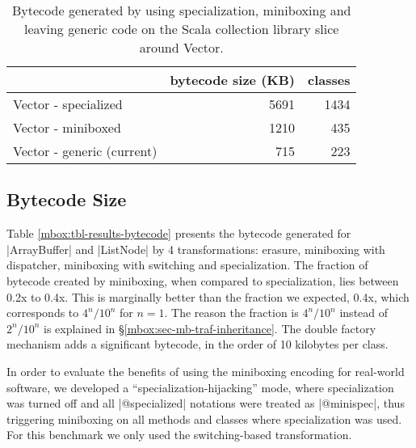 \begin{table}[b!]
\centering
\small
\begin{tabular}{l|r|r}
                               &  bytecode size (KB) & classes \\\hline
Vector - specialized           &                5691 &    1434 \\
\rowcolor{Gray}
Vector - miniboxed             &                1210 &     435 \\
Vector - generic (current)     &                 715 &     223 \\
\end{tabular}
\caption{Bytecode generated by using specialization, miniboxing and leaving generic code on the Scala collection library slice around Vector.}
\label{mbox:tbl-results-bytecode-vector}
\end{table}

\subsection{Bytecode Size}
\label{mbox:subsec-eval-size}

Table \ref{mbox:tbl-results-bytecode} presents the bytecode generated for |ArrayBuffer| and |ListNode| by 4 transformations: erasure, miniboxing with dispatcher, miniboxing with switching and specialization. The fraction of bytecode created by miniboxing, when compared to specialization, lies between 0.2x to 0.4x. This is marginally better than the fraction we expected, 0.4x, which corresponds to $4^n / 10^n$ for $n=1$. The reason the fraction is $4^n / 10^n$ instead of $2^n / 10^n$ is explained in \S \ref{mbox:sec-mb-traf-inheritance}. The double factory mechanism adds a significant bytecode, in the order of 10 kilobytes per class.

In order to evaluate the benefits of using the miniboxing encoding for real-world software, we developed a ``specialization-hijacking'' mode, where specialization was turned off and all |@specialized| notations were treated as |@minispec|, thus triggering miniboxing on all methods and classes where specialization was used. For this benchmark we only used the switching-based transformation.

